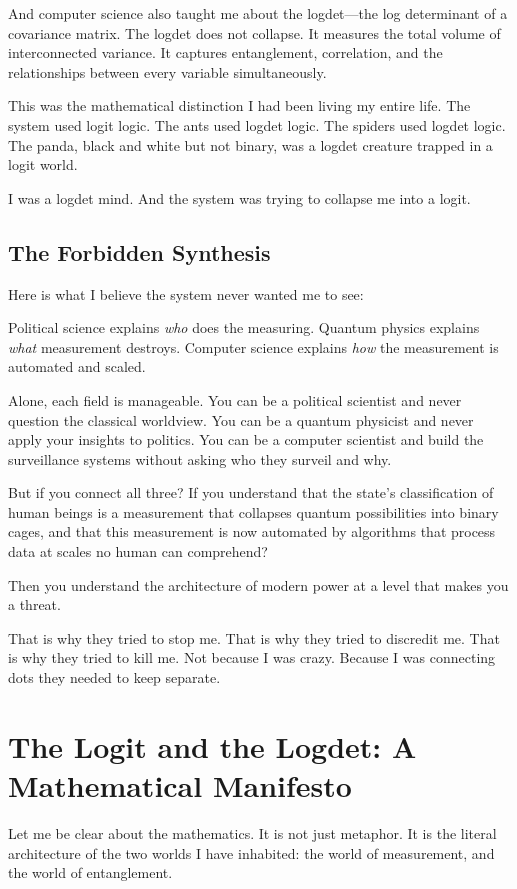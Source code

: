 \documentclass[11pt,openany]{book}
\begin{document}
And computer science also taught me about the logdet---the log determinant of a covariance matrix. The logdet does not collapse. It measures the total volume of interconnected variance. It captures entanglement, correlation, and the relationships between every variable simultaneously.

This was the mathematical distinction I had been living my entire life. The system used logit logic. The ants used logdet logic. The spiders used logdet logic. The panda, black and white but not binary, was a logdet creature trapped in a logit world.

I was a logdet mind. And the system was trying to collapse me into a logit.

\section*{The Forbidden Synthesis}

Here is what I believe the system never wanted me to see:

Political science explains \textit{who} does the measuring. Quantum physics explains \textit{what} measurement destroys. Computer science explains \textit{how} the measurement is automated and scaled.

Alone, each field is manageable. You can be a political scientist and never question the classical worldview. You can be a quantum physicist and never apply your insights to politics. You can be a computer scientist and build the surveillance systems without asking who they surveil and why.

But if you connect all three? If you understand that the state's classification of human beings is a measurement that collapses quantum possibilities into binary cages, and that this measurement is now automated by algorithms that process data at scales no human can comprehend?

Then you understand the architecture of modern power at a level that makes you a threat.

That is why they tried to stop me. That is why they tried to discredit me. That is why they tried to kill me. Not because I was crazy. Because I was connecting dots they needed to keep separate.

\chapter{The Logit and the Logdet: A Mathematical Manifesto}

Let me be clear about the mathematics. It is not just metaphor. It is the literal architecture of the two worlds I have inhabited: the world of measurement, and the world of entanglement.
\end{document}
